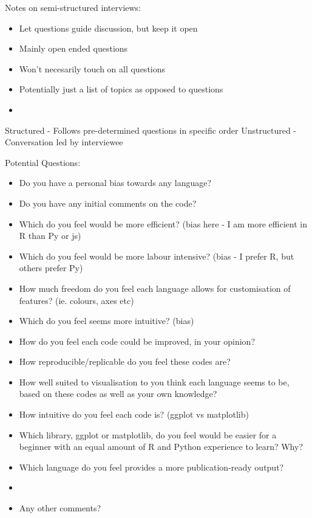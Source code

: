 Notes on semi-structured interviews:
\begin{itemize}
    \item Let questions guide discussion, but keep it open
    \item Mainly open ended questions
    \item Won't necesarily touch on all questions
    \item Potentially just a list of topics as opposed to questions
    \item 
\end{itemize}

Structured - Follows pre-determined questions in specific order
Unstructured  - Conversation led by interviewee

Potential Questions: 
\begin{itemize}
    \item Do you have a personal bias towards any language?
    \item Do you have any initial comments on the code?
    \item Which do you feel would be more efficient? (bias here - I am more efficient in R than Py or js)
    \item Which do you feel would be more labour intensive? (bias - I prefer R, but others prefer Py)
    \item How much freedom do you feel each language allows for customisation of features? (ie. colours, axes etc)
    \item Which do you feel seems more intuitive? (bias)
    \item How do you feel each code could be improved, in your opinion?
    \item How reproducible/replicable do you feel these codes are?
    \item How well suited to visualisation to you think each language seems to be, based on these codes as well as your own knowledge?
    \item How intuitive do you feel each code is? (ggplot vs matplotlib)
    \item Which library, ggplot or matplotlib, do you feel would be easier for a beginner with an equal amount of R and Python experience to learn? Why?
    \item Which language do you feel provides a more publication-ready output?
    \item 
    \item Any other comments?
\end{itemize}